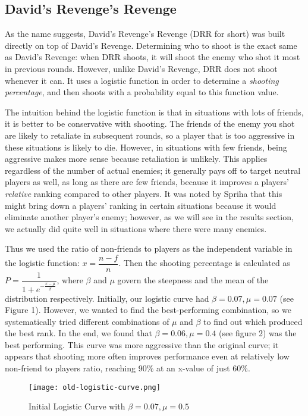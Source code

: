 \documentclass[
10pt, %
letterpaper, %
oneside, %
headinclude,footinclude, %
english
]{article}
\begin{document}
\subsection{David's Revenge's Revenge}

As the name suggests, David's Revenge's Revenge (DRR for short) was built directly on top of David's Revenge. Determining who to shoot is the exact same as David's Revenge: when DRR shoots, it will shoot the enemy who shot it most in previous rounds. However, unlike David's Revenge, DRR does not shoot whenever it can. It uses a logistic function in order to determine a \textit{shooting percentage}, and then shoots with a probability equal to this function value.

The intuition behind the logistic function is that in situations with lots of friends, it is better to be conservative with shooting. The friends of the enemy you shot are likely to retaliate in subsequent rounds, so a player that is too aggressive in these situations is likely to die. However, in situations with few friends, being aggressive makes more sense because retaliation is unlikely. This applies regardless of the number of actual enemies; it generally pays off to target neutral players as well, as long as there are few friends, because it improves a players' \textit{relative} ranking compared to other players. It was noted by Spriha that this might bring down a players' ranking in certain situations because it would eliminate another player's enemy; however, as we will see in the results section, we actually did quite well in situations where there were many enemies.

Thus we used the ratio of non-friends to players as the independent variable in the logistic function: $x = \dfrac{n - f}{n}$. Then the shooting percentage is calculated as $P = \dfrac{1}{1 + e^{-\frac{x - \mu}{\beta}}}$, where $\beta$ and $\mu$ govern the steepness and the mean of the distribution respectively. Initially, our logistic curve had $\beta=0.07,\mu=0.07$ (see Figure 1). However, we wanted to find the best-performing combination, so we systematically tried different combinations of $\mu$ and $\beta$ to find out which produced the best rank. In the end, we found that $\beta=0.06,\mu=0.4$ (see figure 2) was the best performing. This curve was more aggressive than the original curve; it appears that shooting more often improves performance even at relatively low non-friend to players ratio, reaching 90\% at an x-value of just 60\%.

\begin{figure}[h]
\centering
\texttt{[image: old-logistic-curve.png]}
\caption[Initial logistic curve with $\beta=0.07,\mu=0.5$]{Initial Logistic Curve with $\beta=0.07,\mu=0.5$}
\label{fig:gallery2}
\end{figure}
\end{document}
